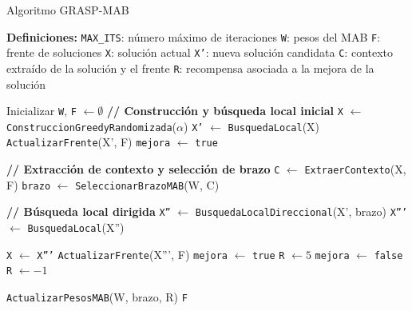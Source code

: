 \documentclass[12pt,a4paper]{book}
\begin{document}
\begin{algorithm}[H]
\caption{Algoritmo GRASP-MAB}
\begin{algorithmic}[1]
    \Statex \textbf{Definiciones:}
    \Statex \hspace{1em} \texttt{MAX\_ITS}: número máximo de iteraciones
    \Statex \hspace{1em} \texttt{W}: pesos del MAB
    \Statex \hspace{1em} \texttt{F}: frente de soluciones
    \Statex \hspace{1em} \texttt{X}: solución actual
    \Statex \hspace{1em} \texttt{X'}: nueva solución candidata
    \Statex \hspace{1em} \texttt{C}: contexto extraído de la solución y el frente
    \Statex \hspace{1em} \texttt{R}: recompensa asociada a la mejora de la solución

    \Statex

    \State Inicializar \texttt{W}, \texttt{F} $\gets \emptyset$
        \Statex \textbf{// Construcción y búsqueda local inicial}
        \State \texttt{X} $\gets$ \texttt{ConstruccionGreedyRandomizada}($\alpha$)
        \State \texttt{X'} $\gets$ \texttt{BusquedaLocal}(X)
        \State \texttt{ActualizarFrente}(X', F)
        \State \texttt{mejora} $\gets$ \texttt{true}
        
            \Statex \textbf{// Extracción de contexto y selección de brazo}
            \State \texttt{C} $\gets$ \texttt{ExtraerContexto}(X, F)
            \State \texttt{brazo} $\gets$ \texttt{SeleccionarBrazoMAB}(W, C)
            
            \Statex \textbf{// Búsqueda local dirigida}
            \State \texttt{X''} $\gets$ \texttt{BusquedaLocalDireccional}(X', brazo)
            \State \texttt{X'''} $\gets$ \texttt{BusquedaLocal}(X'')
            
                \State \texttt{X} $\gets$ \texttt{X'''}
                \State \texttt{ActualizarFrente}(X''', F)
                \State \texttt{mejora} $\gets$ \texttt{true}
                \State \texttt{R} $\gets 5$
            \Else
                \State \texttt{mejora} $\gets$ \texttt{false}
                \State \texttt{R} $\gets -1$
            \EndIf

            \State \texttt{ActualizarPesosMAB}(W, brazo, R)
        \EndWhile
    \EndFor
    \State \Return \texttt{F}
\end{algorithmic}
\end{algorithm}
\end{document}
